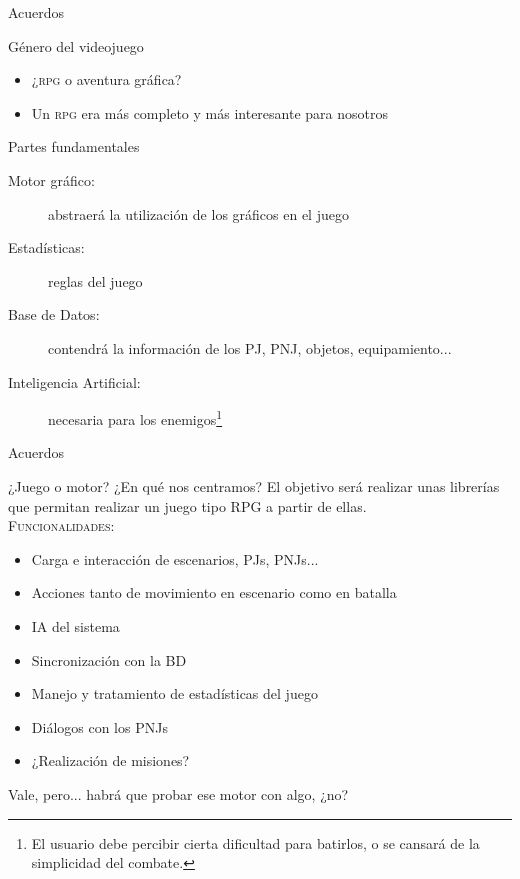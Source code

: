 \documentclass[9pt,xcolor=svgnames]{beamer}
\begin{document}
  \begin{frame}{Acuerdos}
   \transdissolve
   
   \begin{block}{Género del videojuego}
    \begin{itemize}
     \item ¿\textsc{rpg} o aventura gráfica?
     \item Un \textsc{rpg} era más completo y más interesante para
	   nosotros
    \end{itemize}
   \end{block}
   
   \begin{block}{Partes fundamentales}   
    \begin{description}
     \item[Motor gráfico: ] abstraerá la utilización de los gráficos en
		el juego
     \item[Estadísticas: ] reglas del juego
     \item[Base de Datos: ] contendrá la información de los PJ, PNJ,
		objetos, equipamiento...
     \item[Inteligencia Artificial: ] necesaria para los
		enemigos\footnote{El usuario debe percibir cierta
		dificultad para batirlos, o se cansará de la simplicidad
		del combate.}
    \end{description}
   \end{block}
  \end{frame}
  
  \begin{frame}{Acuerdos}
   \transdissolve
   
   \begin{block}{¿Juego o motor? ¿En qué nos centramos?}
    El objetivo será realizar unas librerías que permitan realizar un
    juego tipo RPG a partir de ellas.\\
    
    \textsc{Funcionalidades}:
    \begin{itemize}
     \item Carga e interacción de escenarios, PJs, PNJs...
     \item Acciones tanto de movimiento en escenario como en batalla
     \item IA del sistema
     \item Sincronización con la BD
     \item Manejo y tratamiento de estadísticas del juego
     \item Diálogos con los PNJs
     \item ¿Realización de misiones?
    \end{itemize}
   \end{block}
   
   Vale, pero... habrá que probar ese motor con algo, ¿no?
  \end{frame}
  
\end{document}
